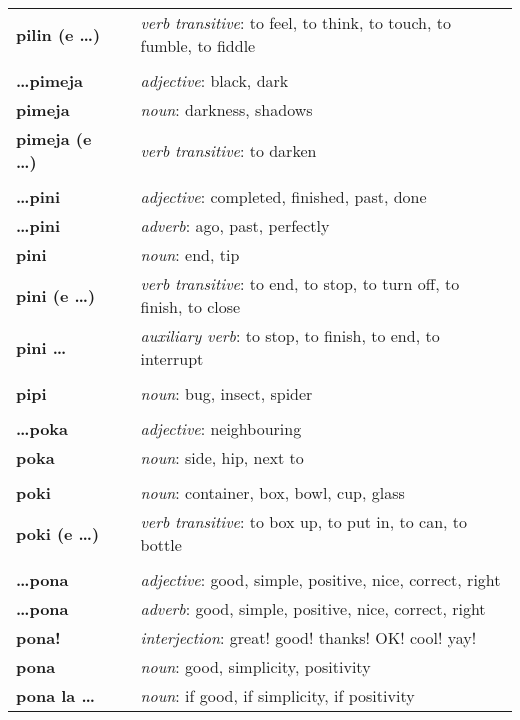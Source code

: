 \begin{supertabular}{p{2,5cm}|ll}
\textbf{pilin (e \dots)} && \textit{verb transitive}: to feel, to think, to touch, to fumble, to fiddle \\ 
 && \\ %
\textbf{\dots pimeja} && \textit{adjective}: black, dark \\ 
\textbf{pimeja} && \textit{noun}: darkness, shadows \\ 
\textbf{pimeja (e \dots)} && \textit{verb transitive}: to darken \\ 
 && \\ %
\textbf{\dots pini} && \textit{adjective}: completed, finished, past, done \\ 
\textbf{\dots pini} && \textit{adverb}: ago, past, perfectly \\ 
\textbf{pini} && \textit{noun}: end, tip \\ 
\textbf{pini (e \dots)} && \textit{verb transitive}: to end, to stop, to turn off, to finish, to close \\ 
\textbf{pini \dots } && \textit{auxiliary verb}: to stop, to finish, to end, to interrupt \\ 
 && \\ %
\textbf{pipi} && \textit{noun}: bug, insect, spider \\ 
 && \\ %
\textbf{\dots poka} && \textit{adjective}: neighbouring \\ 
\textbf{poka} && \textit{noun}: side, hip, next to \\ 
 && \\ %
\textbf{poki} && \textit{noun}: container, box, bowl, cup, glass \\ 
\textbf{poki (e \dots)} && \textit{verb transitive}: to box up, to put in, to can, to bottle \\ 
 && \\ %
\textbf{\dots pona} && \textit{adjective}: good, simple, positive, nice, correct, right \\ 
\textbf{\dots pona} && \textit{adverb}: good, simple, positive, nice, correct, right \\ 
\textbf{pona!} && \textit{interjection}: great! good! thanks! OK! cool! yay! \\ 
\textbf{pona} && \textit{noun}: good, simplicity, positivity \\ 
\textbf{pona la \dots} && \textit{noun}: if good, if simplicity, if positivity \\ 

\end{supertabular}
